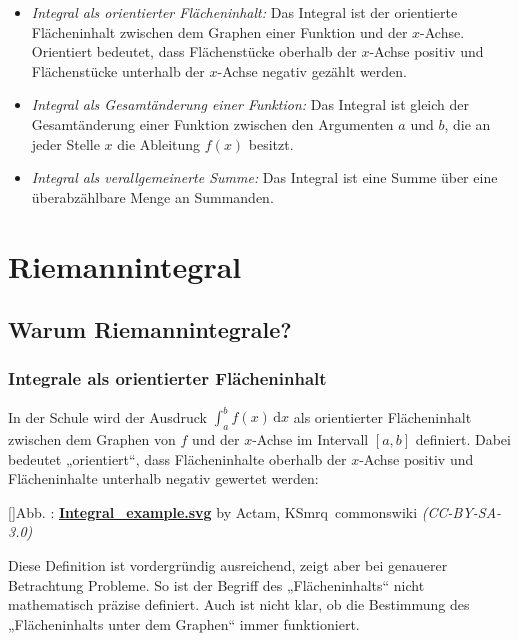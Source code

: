 \documentclass[fontsize=9pt,
               parskip=half-,
               DIV=14,
               listof=chapterentry,
               tocflat]{scrbook}
\newcounter{imagelabel}
\begin{document}
\begin{itemize}
\item \emph{Integral als orientierter Flächeninhalt:} Das Integral ist der orientierte Flächeninhalt zwischen dem Graphen einer Funktion und der $x$-Achse. Orientiert bedeutet, dass Flächenstücke oberhalb der $x$-Achse positiv und Flächenstücke unterhalb der $x$-Achse negativ gezählt werden.
\item \emph{Integral als Gesamtänderung einer Funktion:} Das Integral ist gleich der Gesamtänderung einer Funktion zwischen den Argumenten $a$ und $b$, die an jeder Stelle $x$ die Ableitung $f(x)$ besitzt.
\item \emph{Integral als verallgemeinerte Summe:} Das Integral ist eine Summe über eine überabzählbare Menge an Summanden.
\end{itemize}



\chapter{Riemannintegral}

\section{Warum Riemannintegrale?}

\subsection{Integrale als orientierter Flächeninhalt}

In der Schule wird der Ausdruck $\int _{a}^{b}f(x)\,\mathrm {d} x$ als orientierter Flächeninhalt zwischen dem Graphen von $f$ und der $x$-Achse im Intervall $[a,b]$ definiert. Dabei bedeutet „orientiert“, dass Flächeninhalte oberhalb der $x$-Achse positiv und Flächeninhalte unterhalb negativ gewertet werden:

[]{Abb. : \protect\href{https://commons.wikimedia.org/wiki/File:Integral_example.svg}{\textbf{Integral\allowbreak\_example.svg}} by Actam, KSmrq~commonswiki \textit{(CC-BY-SA-3.0)}}\begin{center}
\end{center}

Diese Definition ist vordergründig ausreichend, zeigt aber bei genauerer Betrachtung Probleme. So ist der Begriff des „Flächeninhalts“ nicht mathematisch präzise definiert. Auch ist nicht klar, ob die Bestimmung des „Flächeninhalts unter dem Graphen“ immer funktioniert.
\end{document}
